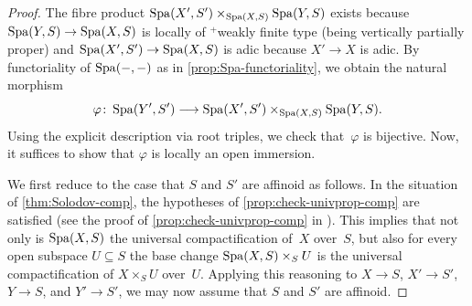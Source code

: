 \begin{proof}
    The fibre product $\operatorname{Spa}(X',S') \times_{\operatorname{Spa}(X,S)} \operatorname{Spa}(Y,S)$ exists because $\operatorname{Spa}(Y,S) \to \operatorname{Spa}(X,S)$ is locally of ${}^+$weakly finite type (being vertically partially proper) and $\operatorname{Spa}(X',S') \to \operatorname{Spa}(X,S)$ is adic because $X' \to X$ is adic.
    By functoriality of $\operatorname{Spa}(-,-)$ as in \cref{prop:Spa-functoriality}, we obtain the natural morphism
    \[
       \varphi \colon \operatorname{Spa}(Y',S') \longrightarrow \operatorname{Spa}(X',S') \times_{\operatorname{Spa}(X,S)} \operatorname{Spa}(Y,S).
    \]
    Using the explicit description via root triples, we check that~$\varphi$ is bijective.
    Now, it suffices to show that $\varphi$ is locally an open immersion.

    We first reduce to the case that $S$ and $S'$ are affinoid as follows. 
    In the situation of \cref{thm:Solodov-comp}, the hypotheses of \cref{prop:check-univprop-comp} 
    are satisfied (see the proof of \cref{prop:check-univprop-comp} in \cite[Theorem~3.29]{Solodov-vertical-compactification}).
    This implies that not only is $\operatorname{Spa}(X,S)$ the universal compactification of~$X$ over~$S$, but also for every open subspace $U \subseteq S$ the base change $\operatorname{Spa}(X,S) \times_S U$ is the universal compactification of $X \times_S U$ over~$U$.
    Applying this reasoning to $X \to S$, $X' \to S'$, $Y \to S$, and $Y' \to S'$, we may now assume that $S$ and $S'$ are affinoid. 


\end{proof}
